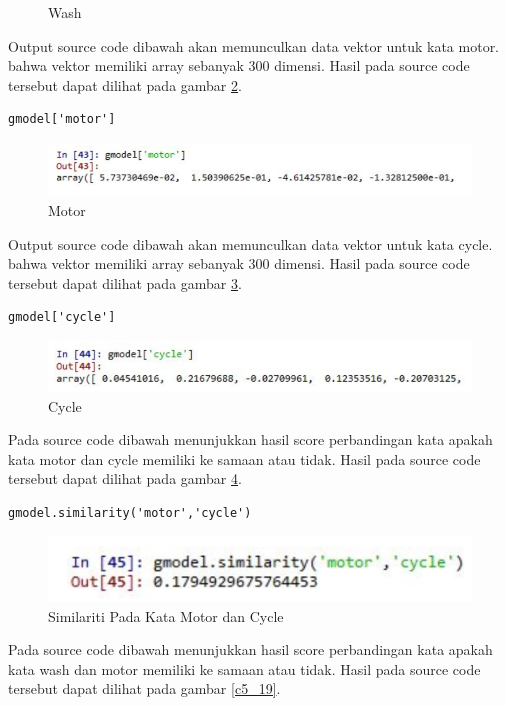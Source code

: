 \begin{enumerate}
\begin{figure}[ht]
	\caption{Wash}
	\label{c5_15}
\end{figure}
\subitem Output source code dibawah akan memunculkan data vektor untuk kata motor. bahwa vektor memiliki array sebanyak 300 dimensi. Hasil pada source code tersebut dapat dilihat pada gambar \ref{c5_16}.
\begin{verbatim}
gmodel['motor']
\end{verbatim}
\begin{figure}[ht]
	\centerline{\includegraphics[width=1\textwidth]{figures/andi/E10.PNG}}
	\caption{Motor}
	\label{c5_16}
\end{figure}
\subitem Output source code dibawah akan memunculkan data vektor untuk kata cycle. bahwa vektor memiliki array sebanyak 300 dimensi. Hasil pada source code tersebut dapat dilihat pada gambar \ref{c5_17}.
\begin{verbatim}
gmodel['cycle']
\end{verbatim}
\begin{figure}[ht]
	\centerline{\includegraphics[width=1\textwidth]{figures/andi/E11.PNG}}
	\caption{Cycle}
	\label{c5_17}
\end{figure}
\subitem Pada source code dibawah menunjukkan hasil score perbandingan kata apakah kata motor dan cycle memiliki ke samaan atau tidak.  Hasil pada source code tersebut dapat dilihat pada gambar \ref{c5_18}.
\begin{verbatim}
gmodel.similarity('motor','cycle')
\end{verbatim}
\begin{figure}[ht]
	\centerline{\includegraphics[width=1\textwidth]{figures/andi/E12.PNG}}
	\caption{Similariti Pada Kata Motor dan Cycle}
	\label{c5_18}
\end{figure}
\subitem Pada source code dibawah menunjukkan hasil score perbandingan kata apakah kata wash dan motor memiliki ke samaan atau tidak.  Hasil pada source code tersebut dapat dilihat pada gambar \ref{c5_19}.

\end{enumerate}
